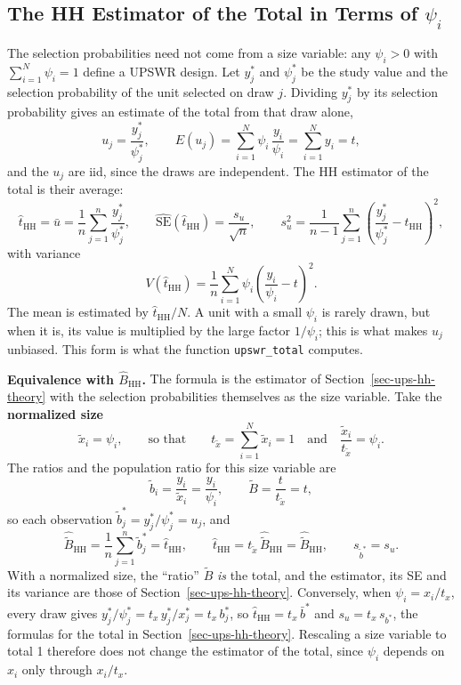 \documentclass[
  letterpaper,
  DIV=11,
  numbers=noendperiod]{scrreprt}
\renewcommand{\[}{\begin{equation}}
\renewcommand{\]}{\end{equation}}
\begin{document}
\subsection{\texorpdfstring{The HH Estimator of the Total in Terms of
\(\psi_i\)}{The HH Estimator of the Total in Terms of \textbackslash psi\_i}}\label{sec-ups-hh-psi}

The selection probabilities need not come from a size variable: any
\(\psi_i>0\) with \(\sum_{i=1}^N\psi_i=1\) define a UPSWR design. Let
\(y_j^*\) and \(\psi_j^*\) be the study value and the selection
probability of the unit selected on draw \(j\). Dividing \(y_j^*\) by
its selection probability gives an estimate of the total from that draw
alone, \[
u_j=\frac{y_j^*}{\psi_j^*},\qquad
E(u_j)=\sum_{i=1}^N\psi_i\,\frac{y_i}{\psi_i}=\sum_{i=1}^N y_i=t ,
\] and the \(u_j\) are iid, since the draws are independent. The HH
estimator of the total is their average: \[
\boxed{\hat{t}_{\mathrm{HH}}=\bar u=\frac1n\sum_{j=1}^n\frac{y_j^*}{\psi_j^*},\qquad
\widehat{\mathrm{SE}}(\hat{t}_{\mathrm{HH}})=\frac{s_u}{\sqrt n},\qquad
s_u^2=\frac{1}{n-1}\sum_{j=1}^n\left(\frac{y_j^*}{\psi_j^*}-\hat{t}_{\mathrm{HH}}\right)^2},
\] with variance \[
V(\hat{t}_{\mathrm{HH}})=\frac1n\sum_{i=1}^N\psi_i\left(\frac{y_i}{\psi_i}-t\right)^2 .
\] The mean is estimated by \(\hat{t}_{\mathrm{HH}}/N\). A unit with a
small \(\psi_i\) is rarely drawn, but when it is, its value is
multiplied by the large factor \(1/\psi_i\); this is what makes \(u_j\)
unbiased. This form is what the function \texttt{upswr\_total} computes.

\textbf{Equivalence with \(\hat{B}_{\mathrm{HH}}\).} The formula is the
estimator of Section~\ref{sec-ups-hh-theory} with the selection
probabilities themselves as the size variable. Take the
\textbf{normalized size} \[
\tilde{x}_i=\psi_i,\qquad\text{so that}\qquad t_{\tilde{x}}=\sum_{i=1}^N\tilde{x}_i=1
\quad\text{and}\quad \frac{\tilde{x}_i}{t_{\tilde{x}}}=\psi_i .
\] The ratios and the population ratio for this size variable are \[
\tilde{b}_i=\frac{y_i}{\tilde{x}_i}=\frac{y_i}{\psi_i},\qquad
\tilde{B}=\frac{t}{t_{\tilde{x}}}=t ,
\] so each observation \(\tilde{b}_j^*=y_j^*/\psi_j^*=u_j\), and \[
\hat{\tilde{B}}_{\mathrm{HH}}=\frac1n\sum_{j=1}^n\tilde{b}_j^*=\hat{t}_{\mathrm{HH}},\qquad
\hat{t}_{\mathrm{HH}}=t_{\tilde{x}}\,\hat{\tilde{B}}_{\mathrm{HH}}=\hat{\tilde{B}}_{\mathrm{HH}},\qquad
s_{\tilde{b}^*}=s_u .
\] With a normalized size, the ``ratio'' \(\tilde{B}\) \emph{is} the
total, and the estimator, its SE and its variance are those of
Section~\ref{sec-ups-hh-theory}. Conversely, when \(\psi_i=x_i/t_x\),
every draw gives \(y_j^*/\psi_j^*=t_x\,y_j^*/x_j^*=t_x\,b_j^*\), so
\(\hat{t}_{\mathrm{HH}}=t_x\,\bar{b}^*\) and \(s_u=t_x\,s_{b^*}\), the
formulas for the total in Section~\ref{sec-ups-hh-theory}. Rescaling a
size variable to total 1 therefore does not change the estimator of the
total, since \(\psi_i\) depends on \(x_i\) only through \(x_i/t_x\).
\end{document}
